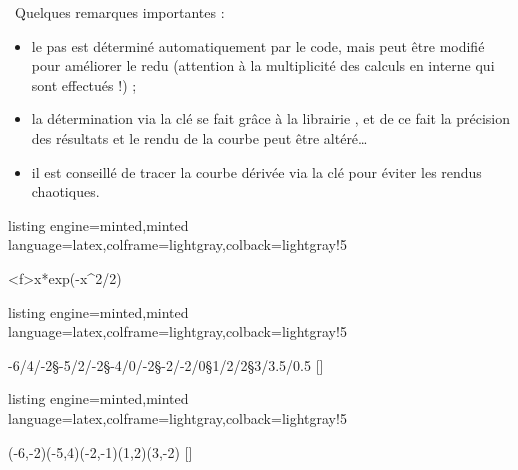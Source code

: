 \documentclass[11pt,a4paper]{ltxdoc}
\begin{document}
{\footnotesize\faBomb}~Quelques remarques importantes :

\begin{itemize}
  \item le pas  est déterminé automatiquement par le code, mais peut être modifié pour améliorer le redu (attention à la multiplicité des calculs en interne qui sont effectués !) ;
  \item la détermination via la clé \MontreCode{[Spline]} se fait grâce à la librairie , et de ce fait la précision des résultats et le rendu de la courbe peut être altéré\ldots
  \item il est conseillé de tracer la courbe dérivée via la clé \MontreCode{[StyleTrace=dashed]} pour éviter les rendus chaotiques.
\end{itemize}

\begin{tcblisting}{listing engine=minted,minted language=latex,colframe=lightgray,colback=lightgray!5}
\begin{GraphiqueTikz}[Ymin=-1,Ymax=1.5]
  \TracerAxesGrilles{}{}
  \DefinirCourbe[Trace,Couleur=blue]<f>{x*exp(-x^2/2)}
\end{GraphiqueTikz}
\end{tcblisting}

\begin{tcblisting}{listing engine=minted,minted language=latex,colframe=lightgray,colback=lightgray!5}
\begin{GraphiqueTikz}[x=0.8cm,y=1cm,Xmin=-7,Xmax=4,Ymin=-3,Ymax=5]
  \TracerAxesGrilles[Grads=false,Elargir=2.5mm]{}{}
  \DefinirListeSpline%
    {-6/4/-2§-5/2/-2§-4/0/-2§-2/-2/0§1/2/2§3/3.5/0.5}%
    [\lstsplineA]
  \DefinirCourbeSpline%
    [Nom=splinetest,Trace,Couleur=teal]%
    {\lstsplineA}
\end{GraphiqueTikz}
\end{tcblisting}

\begin{tcblisting}{listing engine=minted,minted language=latex,colframe=lightgray,colback=lightgray!5}
\begin{GraphiqueTikz}[x=0.8cm,y=1cm,Xmin=-7,Xmax=4,Ymin=-3,Ymax=5]
  \TracerAxesGrilles[Grads=false,Elargir=2.5mm]{}{}
  \DefinirListeInterpo%
    {(-6,-2)(-5,4)(-2,-1)(1,2)(3,-2)}%
    [\interpoA]
  \DefinirCourbeInterpo%
    [Nom=interpotest,Couleur=blue,Trace]{\interpoA}
\end{GraphiqueTikz}
\end{tcblisting}
\end{document}
